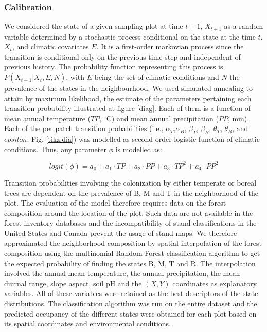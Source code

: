 \subsubsection*{Calibration}

We considered the state of a given sampling plot at time $t+1$, $X_{t+1}$ as a random variable
determined by a stochastic process conditional on the state at the time $t$, $X_t$, and climatic
covariates $E$. It is a first-order markovian process since the transition is conditional only on
the previous time step and independent of previous history. The probability function representing
this process is $P(X_{t+1}|X_t,E,N)$, with $E$ being the set of climatic conditions and $N$ the
prevalence of the states in the neighbourhood. We used simulated annealing \citep[R package
GenSA;][]{YangXiang2013} to attain by maximum likelihood, the estimate of the parameters pertaining
each transition probability illustrated at figure \ref{diag}. Each of them is a function of mean
annual temperature ($TP$, $^{\circ}$C) and mean annual precipitation ($PP$, mm). Each of the per
patch transition probabilities (i.e., $\alpha_T$,$\alpha_B$, $\beta_T$, $\beta_B$, $\theta_T$,
$\theta_B$, and $epsilon$; Fig. \ref{tikz:dia}) was modelled as second order logistic function of
climatic conditions. Thus, any parameter $\phi$ is modelled as:


\begin{equation}
  logit(\phi) = a_0 + a_1 \cdot TP + a_2 \cdot PP + a_3 \cdot TP^2 + a_4 \cdot PP^2
\end{equation}

Transition probabilities involving the colonization by either temperate or boreal trees are
dependent on the prevalence of B, M and T in the neighborhood of the plot. The evaluation of the
model therefore requires data on the forest composition around the location of the plot. Such data
are not available in the forest inventory databases and the incompatibility of stand classifications
in the United States and Canada prevent the usage of stand maps. We therefore approximated the
neighborhood composition by spatial interpolation of the forest composition using the multinomial
Random Forest classification algorithm \citep[R package randomForest;][]{Liaw2002a} to get the
expected probability of finding the states B, M, T and R. The interpolation involved the annual mean
temperature, the annual precipitation, the mean diurnal range, slope aspect, soil pH and the $(X,Y)$
coordinates as explanatory variables. All of these variables were retained as the best descriptors
of the state distributions. The classification algorithm was run on the entire dataset and the
predicted occupancy of the different states were obtained for each plot based on its spatial
coordinates and environmental conditions.

